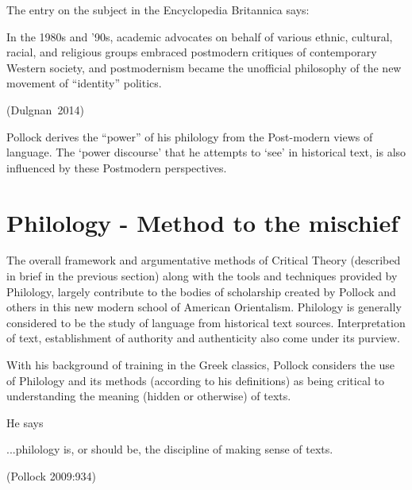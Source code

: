 The entry on the subject in the Encyclopedia Britannica says:
\begin{myquote}
In the 1980s and '90s, academic advocates on behalf of various ethnic, cultural, racial, and religious groups embraced postmodern critiques of contemporary Western society, and postmodernism became the unofficial philosophy of the new movement of ``identity'' politics. 

\hfill \hbox{(Dulgnan 2014)}
\end{myquote}

\newpage

Pollock derives the ``power'' of his philology from the Post-modern views of language. The `power discourse' that he attempts to `see' in historical text, is also influenced by these Postmodern perspectives.

\section*{Philology - Method to the mischief}

The overall framework and argumentative methods of Critical Theory (described in brief in the previous section) along with the tools and techniques provided by Philology, largely contribute to the bodies of scholarship created by Pollock and others in this new modern school of American Orientalism. Philology is generally considered to be the study of language from historical text sources. Interpretation of text, establishment of authority and authenticity also come under its purview.

With his background of training in the Greek classics, Pollock considers the use of Philology and its methods (according to his definitions) as being critical to understanding the meaning (hidden or otherwise) of texts.

He says 
\begin{myquote}
...philology is, or should be, the discipline of making sense of texts.

\hfill (Pollock 2009:934)
\end{myquote}

